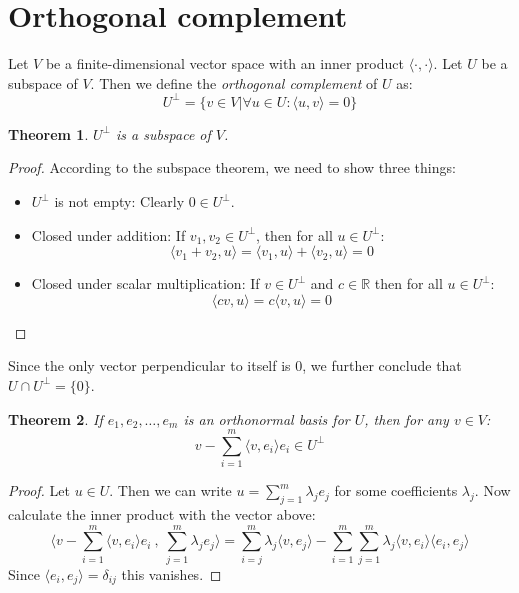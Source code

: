 \documentclass[12pt, a4paper]{article}
\newtheorem{theorem}{Theorem}[section]
\numberwithin{equation}{section}
\begin{document}
\section{Orthogonal complement}
Let $V$ be a finite-dimensional vector space with an inner product $\langle\cdot,\cdot\rangle$. Let $U$ be a subspace of $V$. Then we define the \textit{orthogonal complement} of $U$ as:
\begin{equation}
U^\perp=\{v\in V|\forall u\in U: \langle u, v\rangle = 0\}
\end{equation}
\begin{theorem}
$U^\perp$ is a subspace of $V$.
\end{theorem}
\begin{proof}
According to the subspace theorem, we need to show three things:
\begin{itemize}
\item $U^\perp$ is not empty: Clearly $0\in U^\perp$.
\item Closed under addition: If $v_1,v_2\in U^\perp$, then for all $u\in U^\perp$:
\begin{equation}
\langle v_1+v_2,u\rangle=\langle v_1,u\rangle + \langle v_2,u\rangle = 0 
\end{equation}
\item Closed under scalar multiplication: If $v\in U^\perp$ and $c\in\mathbb{R}$ then for all $u\in U^\perp$:
\begin{equation}
\langle cv,u\rangle = c\langle v,u\rangle = 0
\end{equation}
\end{itemize}
\end{proof}

Since the only vector perpendicular to itself is $0$, we further conclude that $U\cap U^\perp=\{0\}$.

\begin{theorem}
If $e_1, e_2,\ldots,e_m$ is an orthonormal basis for $U$, then for any $v\in V$:
\begin{equation}
v-\sum_{i=1}^m\langle v,e_i\rangle e_i\in U^\perp
\end{equation}
\end{theorem}
\begin{proof}
Let $u\in U$. Then we can write $u=\sum_{j=1}^m\lambda_j e_j$ for some coefficients $\lambda_j$. Now calculate the inner product with the vector above:
\begin{equation}
\langle v-\sum_{i=1}^m\langle v,e_i\rangle e_i\ ,\ \sum_{j=1}^m\lambda_j e_j\rangle=\sum_{i=j}^m\lambda_j\langle v,e_j\rangle-\sum_{i=1}^m\sum_{j=1}^m\lambda_j\langle v,e_i\rangle\langle e_i,e_j\rangle
\end{equation}
Since $\langle e_i,e_j\rangle=\delta_{ij}$ this vanishes.
\end{proof}
\end{document}

